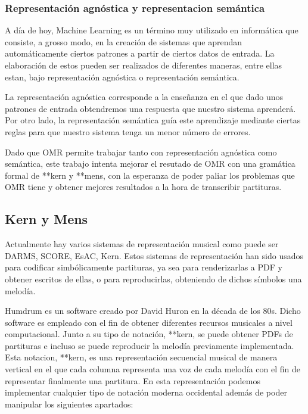 \documentclass{article}
\begin{document}
\subsubsection{Representación agnóstica y representacion semántica}
A día de hoy, Machine Learning es un término muy utilizado en informática que consiste, a grosso modo, en la creación de
sistemas que aprendan automáticamente ciertos patrones a partir de ciertos datos de entrada. La elaboración de estos pueden
ser realizados de diferentes maneras, entre ellas estan, bajo representación agnóstica o representación semántica.

La representación agnóstica corresponde a la enseñanza en el que dado unos patrones de entrada obtendremos una respuesta
que nuestro sistema aprenderá. Por otro lado, la representación semántica guía este aprendizaje mediante ciertas reglas
para que nuestro sistema tenga un menor número de errores.

Dado que OMR permite trabajar tanto con representación agnóstica como semántica, este trabajo intenta mejorar el resutado
de OMR con una gramática formal de **kern\cite{kern} y **mens\cite{mens}, con la esperanza de poder paliar los problemas
que OMR tiene y obtener mejores resultados a la hora de transcribir partituras.

\subsection{Kern y Mens}
 Actualmente hay varios sistemas de representación musical como puede ser DARMS\cite{darms}, SCORE\cite{score},
EsAC\cite{esac}, Kern\cite{kern}. Estos sistemas de representación han sido usados para
codificar simbólicamente partituras, ya sea para renderizarlas a PDF y obtener escritos de ellas, o para reproducirlas,
obteniendo de dichos símbolos una melodía.

Humdrum\cite{humdrum} es un software creado por David Huron en la década de los 80s. Dicho software es empleado con el fin de obtener
diferentes recursos musicales a nivel computacional. Junto a su tipo de notación, **kern, se puede obtener PDFs de partituras
e incluso se puede reproducir la melodía previamente implementada. Esta notacion, **kern, es una representación secuencial musical de manera vertical
en el que cada columna representa una voz de cada melodía con el fin de representar finalmente una partitura. En esta
representación podemos implementar cualquier tipo de notación moderna occidental además de poder manipular los siguientes apartados:
\end{document}
